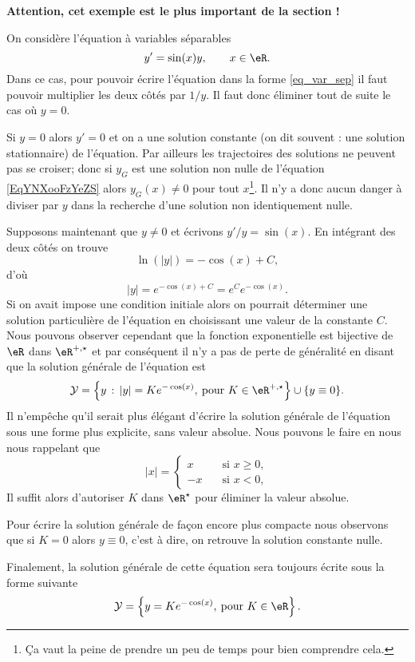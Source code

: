 \begin{example}\label{exemple_eq_hom}
	\textbf{Attention, cet exemple est le plus important de la section !}

	On considère l'équation à variables séparables
	\begin{equation}    \label{EqYNXooFzYeZS}
		y' = \sin(x) y , \qquad x\in\eR.
	\end{equation}
	Dans ce cas, pour pouvoir écrire l'équation dans la forme \eqref{eq_var_sep} il faut pouvoir multiplier les deux c\^otés par $1/y$. Il faut donc éliminer tout de suite le cas o\`u $y = 0$.

	Si $y= 0$ alors $y' =0$ et on a une solution constante (on dit souvent : une solution stationnaire) de l'équation. Par ailleurs les trajectoires des solutions ne peuvent pas se croiser; donc si \( y_G\) est une solution non nulle de l'équation \eqref{EqYNXooFzYeZS} alors \( y_G(x)\neq 0\) pour tout \( x\)\footnote{Ça vaut la peine de prendre un peu de temps pour bien comprendre cela.}. Il n'y a donc aucun danger à diviser par \( y\) dans la recherche d'une solution non identiquement nulle.

	Supposons maintenant que $y\neq 0$ et écrivons $y'/y = \sin(x)$. En intégrant des deux côtés on trouve
	\[
		\ln(|y|) =- \cos(x) +C,
	\]
	d'où
	\[
		|y| = e^{- \cos(x) +C}= e^{C}e^{- \cos(x)}.
	\]
	Si on avait impose une condition initiale alors on pourrait déterminer une solution particulière de l'équation en choisissant une valeur de la constante $C$. Nous pouvons observer cependant que la fonction exponentielle est bijective de $\eR$ dans $\eR^{+,\star}$ et par conséquent il n'y a pas de perte de généralité en disant que la solution générale de l'équation est
	\begin{equation*}
		\mathcal{Y} = \left\{ y \,:\, |y| = Ke^{- \cos(x)}, \:\text{pour } K\in\eR^{+,\star}\right\}\cup\{y\equiv 0\}.
	\end{equation*}
	Il n'empêche qu'il serait plus élégant d'écrire la solution générale de l'équation sous une forme plus explicite, sans valeur absolue. Nous pouvons le faire en nous nous rappelant que
	\begin{equation*}
		|x| =  \begin{cases}
			x  & \quad\text{si } x \geq 0 , \\
			-x & \quad\text{si } x <0 ,
		\end{cases}
	\end{equation*}
	Il suffit alors d'autoriser $K$ dans $\eR^{\star}$ pour éliminer la valeur absolue.

	Pour écrire la solution générale de façon encore plus compacte nous observons que si $K=0$ alors $y \equiv 0$, c'est \`a dire, on retrouve la solution constante nulle.

	Finalement, la solution générale de cette équation sera toujours écrite sous la forme suivante
	\begin{equation}
		\mathcal{Y} = \left\{ y = Ke^{- \cos(x)}, \:\text{pour } K\in\eR\right\}.
	\end{equation}
\end{example}

